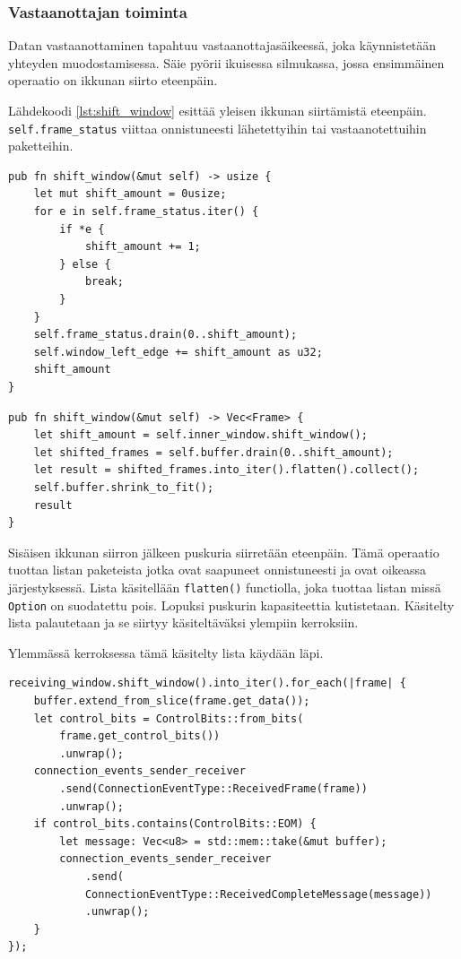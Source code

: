 \documentclass[a4paper,12pt]{article}
\begin{document}
    \subsubsection{Vastaanottajan toiminta}
    Datan vastaanottaminen tapahtuu vastaanottajasäikeessä, joka käynnistetään yhteyden muodostamisessa.
    Säie pyörii ikuisessa silmukassa, jossa ensimmäinen operaatio on ikkunan siirto eteenpäin.

    Lähdekoodi \ref{lst:shift_window} esittää yleisen ikkunan siirtämistä eteenpäin.
    \lstinline{self.frame_status} viittaa onnistuneesti lähetettyihin tai vastaanotettuihin paketteihin.

    \begin{lstlisting}[caption={Ikkunan siirto}, label={lst:shift_window}]
pub fn shift_window(&mut self) -> usize {
    let mut shift_amount = 0usize;
    for e in self.frame_status.iter() {
        if *e {
            shift_amount += 1;
        } else {
            break;
        }
    }
    self.frame_status.drain(0..shift_amount);
    self.window_left_edge += shift_amount as u32;
    shift_amount
}\end{lstlisting}


    \begin{lstlisting}[caption={Vastaanottajan ikkunan siirto}, label={lst:shift_rwindow}]
pub fn shift_window(&mut self) -> Vec<Frame> {
    let shift_amount = self.inner_window.shift_window();
    let shifted_frames = self.buffer.drain(0..shift_amount);
    let result = shifted_frames.into_iter().flatten().collect();
    self.buffer.shrink_to_fit();
    result
}\end{lstlisting}

    Sisäisen ikkunan siirron jälkeen puskuria siirretään eteenpäin. Tämä operaatio tuottaa
    listan paketeista jotka ovat saapuneet onnistuneesti ja ovat oikeassa järjestyksessä.
    Lista käsitellään \lstinline{flatten()} functiolla, joka tuottaa listan missä \lstinline{Option}
    on suodatettu pois. Lopuksi puskurin kapasiteettia kutistetaan. Käsitelty lista palautetaan ja se siirtyy käsiteltäväksi ylempiin kerroksiin. \par

    Ylemmässä kerroksessa tämä käsitelty lista käydään läpi.

    \begin{lstlisting}[caption={Pakettien käsittely}, label={lst:handle_shift_window}]
receiving_window.shift_window().into_iter().for_each(|frame| {
    buffer.extend_from_slice(frame.get_data());
    let control_bits = ControlBits::from_bits(
        frame.get_control_bits())
        .unwrap();
    connection_events_sender_receiver
        .send(ConnectionEventType::ReceivedFrame(frame))
        .unwrap();
    if control_bits.contains(ControlBits::EOM) {
        let message: Vec<u8> = std::mem::take(&mut buffer);
        connection_events_sender_receiver
            .send(
            ConnectionEventType::ReceivedCompleteMessage(message))
            .unwrap();
    }
});\end{lstlisting}
\end{document}
